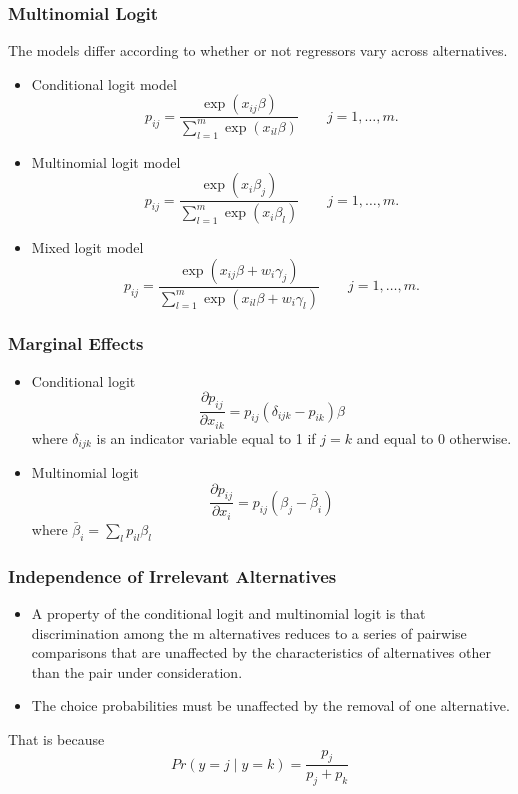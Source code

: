 \documentclass{beamer}
\newcommand{\1}{\mathbb{1}}
\begin{document}
\begin{frame}\frametitle{Multinomial Logit}
The models differ according to whether or not regressors vary across alternatives. 
\begin{itemize}
 \item Conditional logit model
 \begin{equation}
  p_{ij} = \dfrac{\exp(x_{ij}\beta)}{\sum_{l=1}^m \exp(x_{il}\beta)}     \qquad j=1,\ldots,m.
 \end{equation}
 \item Multinomial logit model
  \begin{equation}
  p_{ij} = \dfrac{\exp(x_{i}\beta_j)}{\sum_{l=1}^m \exp(x_{i}\beta_l)}     \qquad j=1,\ldots,m.
 \end{equation}
 \item Mixed logit model
   \begin{equation}
  p_{ij} = \dfrac{\exp(x_{ij}\beta + w_i \gamma_j)}{\sum_{l=1}^m \exp(x_{il}\beta + w_i \gamma_l)}     \qquad j=1,\ldots,m.
 \end{equation}
\end{itemize}
\end{frame}

\begin{frame}\frametitle{Marginal Effects}
\begin{itemize}
 \item Conditional logit
 \begin{equation}
  \dfrac{\partial p_{ij}}{\partial x_{ik}} = p_{ij}(\delta_{ijk}-p_{ik})\beta
 \end{equation}
where $\delta_{ijk}$ is an indicator variable equal to 1 if $j=k$ and equal to 0 otherwise. 
\item Multinomial logit
\begin{equation}
 \dfrac{\partial p_{ij}}{\partial x_{i}} = p_{ij}(\beta_j -\bar{\beta}_i)
\end{equation}
where $\bar{\beta}_i = \sum_{l} p_{il}\beta_l$
\end{itemize}
\end{frame}

\begin{frame}\frametitle{Independence of Irrelevant Alternatives}
\begin{itemize}
 \item A property of the conditional logit and multinomial logit is that discrimination among the m alternatives reduces to a series of pairwise comparisons that are unaffected by the characteristics of alternatives other than the pair under consideration. 
\item The choice probabilities must be unaffected by the removal of one alternative. 
\end{itemize}
That is because
\begin{equation}
 Pr(y=j \mid y=k) = \dfrac{p_j}{p_j + p_k}
\end{equation}
\end{frame}
\end{document}
